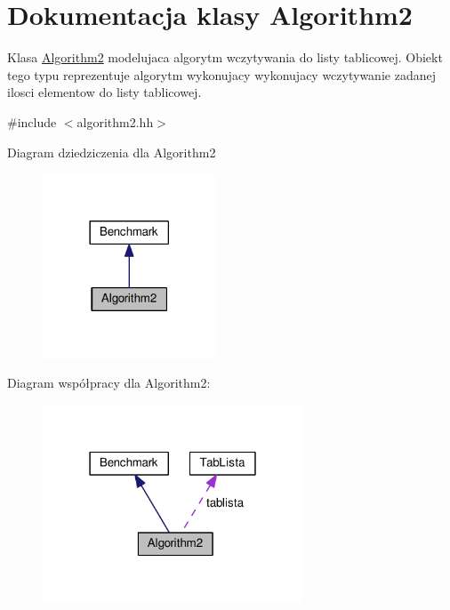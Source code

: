 \hypertarget{class_algorithm2}{\section{Dokumentacja klasy Algorithm2}
\label{class_algorithm2}
}


Klasa \hyperlink{class_algorithm2}{Algorithm2} modelujaca algorytm wczytywania do listy tablicowej. Obiekt tego typu reprezentuje algorytm wykonujacy wykonujacy wczytywanie zadanej ilosci elementow do listy tablicowej.  




{\ttfamily \#include $<$algorithm2.\-hh$>$}



Diagram dziedziczenia dla Algorithm2\nopagebreak
\begin{figure}[H]
\begin{center}
\leavevmode
\includegraphics[width=146pt]{class_algorithm2__inherit__graph}
\end{center}
\end{figure}


Diagram współpracy dla Algorithm2\-:\nopagebreak
\begin{figure}[H]
\begin{center}
\leavevmode
\includegraphics[width=219pt]{class_algorithm2__coll__graph}
\end{center}
\end{figure}

